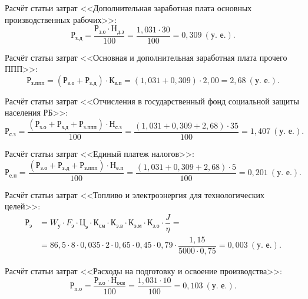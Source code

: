Расчёт статьи затрат 
<<Дополнительная заработная плата основных производственных рабочих>>:
\begin{equation*}
\text{Р}_{\text{з.д}} = 
\dfrac{\text{Р}_{\text{з.о}} \cdot \text{Н}_{\text{д.з}}}{100} = 
\dfrac{1{,}031 \cdot 30}{100} = 
0{,}309 \: (\text{у.~е.}).
\end{equation*}

Расчёт статьи затрат 
<<Основная и дополнительная заработная плата прочего ППП>>:
\begin{equation*}
\text{Р}_{\text{з.ппп}} = 
( \text{Р}_{\text{з.о}} + \text{Р}_{\text{з.д}} ) \cdot \text{К}_{\text{з.п}} =
( 1{,}031 + 0{,}309 ) \cdot 2{,}00 =
2{,}68 \: (\text{у.~е.}).
\end{equation*}

Расчёт статьи затрат 
<<Отчисления в государственный фонд социальной защиты населения РБ>>:
\begin{equation*}
\text{Р}_{\text{с.з}} = 
\dfrac{
  (\text{Р}_{\text{з.о}} + \text{Р}_{\text{з.д}}  + \text{Р}_{\text{з.ппп}}) \cdot \text{Н}_{\text{с.з}}
}{
  100
} =
\dfrac{( 1{,}031 + 0{,}309 + 2{,}68 ) \cdot 35}{100} =
1{,}407 \: (\text{у.~е.}).
\end{equation*}

Расчёт статьи затрат 
<<Единый платеж налогов>>:
\begin{equation*}
\text{Р}_{\text{е.п}} = 
\dfrac{
  (\text{Р}_{\text{з.о}} + \text{Р}_{\text{з.д}}  + \text{Р}_{\text{з.ппп}}) \cdot \text{Н}_{\text{е.п}}
}{
  100
} =
\dfrac{( 1{,}031 + 0{,}309 + 2{,}68 ) \cdot 5}{100} =
0{,}201 \: (\text{у.~е.}).
\end{equation*}

Расчёт статьи затрат 
<<Топливо и электроэнергия для технологических целей>>:
\begin{align*}
\text{Р}_{\text{э}} &= 
W_{\text{у}} \cdot F_{\text{э}} \cdot \text{Ц}_{\text{э}} \cdot
\text{К}_{\text{см}} \cdot \text{К}_{\text{э.в}} \cdot 
\text{К}_{\text{э.м}} \cdot \text{К}_{\text{з.о}} \cdot
\dfrac{J}{\eta} = \\
 &=
86{,}5 \cdot 8 \cdot 0{,}035 \cdot
2 \cdot 0{,}65 \cdot 0{,}45 \cdot 
0{,}79 \cdot 
\dfrac{1{,}15}{5000 \cdot 0{,}75} =
0{,}003 \: (\text{у.~е.}).
\end{align*}

Расчёт статьи затрат 
<<Расходы на подготовку и освоение производства>>:
\begin{equation*}
\text{Р}_{\text{п.о}} = 
\dfrac{
  \text{Р}_{\text{з.о}} \cdot \text{Н}_{\text{осв}}
}{
  100
} =
\dfrac{1{,}031 \cdot 10}{100} =
0{,}103 \: (\text{у.~е.}).
\end{equation*}

